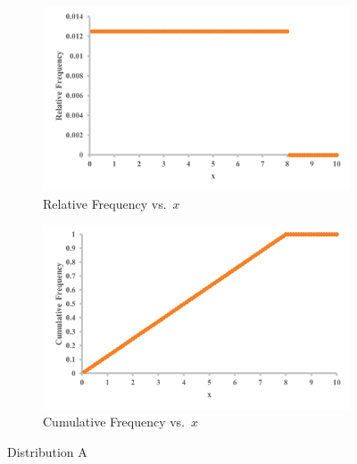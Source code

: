 \documentclass[12pt]{article}
\begin{document}
\begin{figure}[h!]
    \centering
    \begin{subfigure}[b]{0.45\textwidth}
        \includegraphics[width=\textwidth]{graphs/DistA_Rel.png}
        \caption{Relative Frequency vs.\ \(x\)}
    \end{subfigure}
    \hfill
    \begin{subfigure}[b]{0.45\textwidth}
        \includegraphics[width=\textwidth]{graphs/DistA_Cumul.png}
        \caption{Cumulative Frequency vs.\ \(x\)}
    \end{subfigure}
    \label{fig:distA}
    \caption{Distribution A}
\end{figure}
\end{document}

